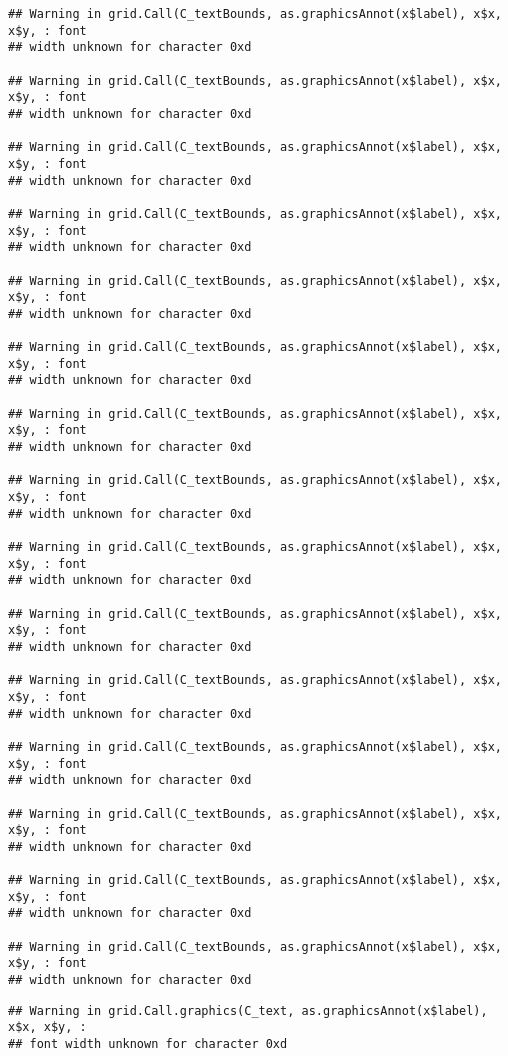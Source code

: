 \documentclass[]{article}
\begin{document}
\begin{verbatim}
## Warning in grid.Call(C_textBounds, as.graphicsAnnot(x$label), x$x, x$y, : font
## width unknown for character 0xd

## Warning in grid.Call(C_textBounds, as.graphicsAnnot(x$label), x$x, x$y, : font
## width unknown for character 0xd

## Warning in grid.Call(C_textBounds, as.graphicsAnnot(x$label), x$x, x$y, : font
## width unknown for character 0xd

## Warning in grid.Call(C_textBounds, as.graphicsAnnot(x$label), x$x, x$y, : font
## width unknown for character 0xd

## Warning in grid.Call(C_textBounds, as.graphicsAnnot(x$label), x$x, x$y, : font
## width unknown for character 0xd

## Warning in grid.Call(C_textBounds, as.graphicsAnnot(x$label), x$x, x$y, : font
## width unknown for character 0xd

## Warning in grid.Call(C_textBounds, as.graphicsAnnot(x$label), x$x, x$y, : font
## width unknown for character 0xd

## Warning in grid.Call(C_textBounds, as.graphicsAnnot(x$label), x$x, x$y, : font
## width unknown for character 0xd

## Warning in grid.Call(C_textBounds, as.graphicsAnnot(x$label), x$x, x$y, : font
## width unknown for character 0xd

## Warning in grid.Call(C_textBounds, as.graphicsAnnot(x$label), x$x, x$y, : font
## width unknown for character 0xd

## Warning in grid.Call(C_textBounds, as.graphicsAnnot(x$label), x$x, x$y, : font
## width unknown for character 0xd

## Warning in grid.Call(C_textBounds, as.graphicsAnnot(x$label), x$x, x$y, : font
## width unknown for character 0xd

## Warning in grid.Call(C_textBounds, as.graphicsAnnot(x$label), x$x, x$y, : font
## width unknown for character 0xd

## Warning in grid.Call(C_textBounds, as.graphicsAnnot(x$label), x$x, x$y, : font
## width unknown for character 0xd

## Warning in grid.Call(C_textBounds, as.graphicsAnnot(x$label), x$x, x$y, : font
## width unknown for character 0xd
\end{verbatim}

\begin{verbatim}
## Warning in grid.Call.graphics(C_text, as.graphicsAnnot(x$label), x$x, x$y, :
## font width unknown for character 0xd
\end{verbatim}
\end{document}
